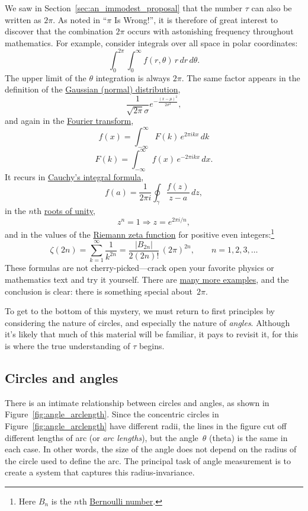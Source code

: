 We saw in Section~\ref{sec:an_immodest_proposal} that the number $\tau$ can also be written as $2\pi$. As noted in ``$\pi$ Is Wrong!'', it is therefore of great interest to discover that the combination $2\pi$ occurs with astonishing frequency throughout mathematics. For example, consider integrals over all space in polar coordinates:
\[
  \int_0^{2\pi}\int_0^\infty f(r, \theta)\, r\, dr\, d\theta.
\]
The upper limit of the $\theta$ integration is always $2\pi$. The same factor appears in the definition of the \href{https://en.wikipedia.org/wiki/Normal_distribution}{Gaussian (normal) distribution},
\[
  \frac{1}{\sqrt{2\pi}\sigma}e^{-\frac{(x-\mu)^2}{2\sigma^2}},
\]
and again in the \href{https://mathworld.wolfram.com/FourierTransform.html}{Fourier transform},
\[
  f(x) = \int_{-\infty}^\infty F(k)\, e^{2\pi ikx}\,dk
\]
\[
    F(k) = \int_{-\infty}^\infty f(x)\, e^{-2\pi ikx}\,dx.
\]
It recurs in \href{https://en.wikipedia.org/wiki/Cauchy's_integral_formula}{Cauchy's integral formula},
\[
  f(a) = \frac{1}{2\pi i}\oint_\gamma\frac{f(z)}{z-a}\,dz,
\]
in the $n$th \href{https://en.wikipedia.org/wiki/Root_of_unity}{roots of unity},
\[
  z^n = 1 \Rightarrow z = e^{2\pi i/n},
\]
and in the values of the \href{https://en.wikipedia.org/wiki/Riemann_zeta_function}{Riemann zeta function} for positive even integers:\footnote{Here $B_n$ is the $n$th \href{https://en.wikipedia.org/wiki/Bernoulli_number}{Bernoulli number}.}
\[
  \zeta(2n) = \sum_{k=1}^\infty \frac{1}{k^{2n}} = \frac{|B_{2n}|}{2(2n)!}\,(2\pi)^{2n},\qquad n = 1, 2, 3, \ldots
\]
These formulas are not cherry-picked---crack open your favorite physics or mathematics text and try it yourself. There are \href{http://www.harremoes.dk/Peter/Undervis/Turnpage/Turnpage1.html}{many more examples}, and the conclusion is clear: there is something special about~$2\pi$.

To get to the bottom of this mystery, we must return to first principles by considering the nature of circles, and especially the nature of \emph{angles}. Although it's likely that much of this material will be familiar, it pays to revisit it, for this is where the true understanding of $\tau$ begins.

  \subsection{Circles and angles} %
  \label{sec:circles_and_angles}

There is an intimate relationship between circles and angles, as shown in Figure~\ref{fig:angle_arclength}. Since the concentric circles in Figure~\ref{fig:angle_arclength} have different radii, the lines in the figure cut off different lengths of arc (or \emph{arc lengths}), but the angle~$\theta$ (theta) is the same in each case. In other words, the size of the angle does not depend on the radius of the circle used to define the arc. The principal task of angle measurement is to create a system that captures this radius-invariance.

